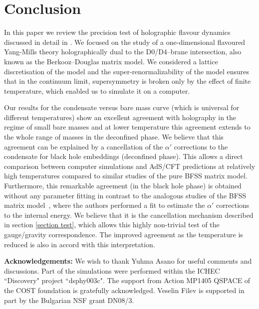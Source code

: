\documentclass[a4paper]{jpconf}
\begin{document}
\section{Conclusion}

In this paper we review the precision test of holographic flavour
dynamics discussed in detail in \cite{Filev:2015cmz}. We focused on
the study of a one-dimensional flavoured Yang-Mills theory
holographically dual to the D0/D4--brane intersection, also known as
the Berkooz--Douglas matrix model.  We considered a lattice
discretisation of the model and the super-renormalizability of the
model ensures that in the continuum limit, supersymmetry is broken
only by the effect of finite temperature, which enabled us to simulate
it on a computer.

Our results for the condensate versus bare mass curve (which is
universal for different temperatures) show an excellent agreement with
holography in the regime of small bare masses and at lower temperature
this agreement extends to the whole range of masses in the deconfined
phase.  We believe that this agreement can be explained by a
cancellation of the $\alpha'$ corrections to the condensate for black
hole embeddings (deconfined phase). This allows a direct comparison
between computer simulations and AdS/CFT predictions at relatively
high temperatures compared to similar studies of the pure BFSS matrix
model. Furthermore, this remarkable agreement (in the black hole
phase) is obtained without any parameter fitting in contrast to the
analogous studies of the BFSS matrix model~\cite{Hanada:2008ez}, where
the authors performed a fit to estimate the $\alpha'$ corrections to
the internal energy. We believe that it is the cancellation mechanism
described in section \ref{section test}, which allows this highly
non-trivial test of the gauge/gravity correspondence. The improved
agreement as the temperature is reduced is also in accord with this
interpretation.

{\bf Acknowledgements:} We wish to thank Yuhma Asano for useful
comments and discussions. Part of the simulations were performed
within the ICHEC ``Discovery" project ``dsphy003c". The support from
Action MP1405 QSPACE of the COST foundation is gratefully acknowledged.
Veselin Filev is supported in part by the Bulgarian NSF grant DN08/3.
\end{document}
